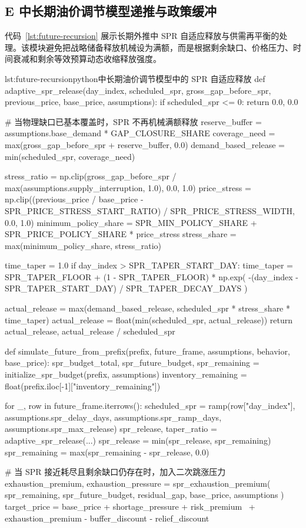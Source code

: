 \subsection*{E 中长期油价调节模型递推与政策缓冲}

代码~\ref{lst:future-recursion} 展示长期外推中 SPR 自适应释放与供需再平衡的处理。该模块避免把战略储备释放机械设为满额，而是根据剩余缺口、价格压力、时间衰减和剩余等效预算动态收缩释放强度。

\begin{paperlisting}{lst:future-recursion}{python}{中长期油价调节模型中的 SPR 自适应释放}
def adaptive_spr_release(day_index, scheduled_spr, gross_gap_before_spr,
                         previous_price, base_price, assumptions):
    if scheduled_spr <= 0:
        return 0.0, 0.0

    # 当物理缺口已基本覆盖时，SPR 不再机械满额释放
    reserve_buffer = assumptions.base_demand * GAP_CLOSURE_SHARE
    coverage_need = max(gross_gap_before_spr + reserve_buffer, 0.0)
    demand_based_release = min(scheduled_spr, coverage_need)

    stress_ratio = np.clip(gross_gap_before_spr / max(assumptions.supply_interruption, 1.0),
                           0.0, 1.0)
    price_stress = np.clip((previous_price / base_price - SPR_PRICE_STRESS_START_RATIO)
                           / SPR_PRICE_STRESS_WIDTH, 0.0, 1.0)
    minimum_policy_share = SPR_MIN_POLICY_SHARE + SPR_PRICE_POLICY_SHARE * price_stress
    stress_share = max(minimum_policy_share, stress_ratio)

    time_taper = 1.0
    if day_index > SPR_TAPER_START_DAY:
        time_taper = SPR_TAPER_FLOOR + (1 - SPR_TAPER_FLOOR) * np.exp(
            -(day_index - SPR_TAPER_START_DAY) / SPR_TAPER_DECAY_DAYS
        )

    actual_release = max(demand_based_release, scheduled_spr * stress_share * time_taper)
    actual_release = float(min(scheduled_spr, actual_release))
    return actual_release, actual_release / scheduled_spr

def simulate_future_from_prefix(prefix, future_frame, assumptions, behavior, base_price):
    spr_budget_total, spr_future_budget, spr_remaining = initialize_spr_budget(prefix, assumptions)
    inventory_remaining = float(prefix.iloc[-1]["inventory_remaining"])

    for _, row in future_frame.iterrows():
        scheduled_spr = ramp(row["day_index"], assumptions.spr_delay_days,
                             assumptions.spr_ramp_days, assumptions.spr_max_release)
        spr_release, taper_ratio = adaptive_spr_release(...)
        spr_release = min(spr_release, spr_remaining)
        spr_remaining = max(spr_remaining - spr_release, 0.0)

        # 当 SPR 接近耗尽且剩余缺口仍存在时，加入二次跳涨压力
        exhaustion_premium, exhaustion_pressure = spr_exhaustion_premium(
            spr_remaining, spr_future_budget, residual_gap, base_price, assumptions
        )
        target_price = base_price + shortage_pressure + risk_premium \
            + exhaustion_premium - buffer_discount - relief_discount
\end{paperlisting}

\clearpage
